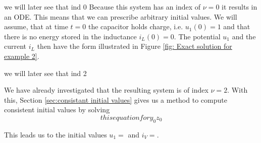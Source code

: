 \begin{example2}
	we will later see that ind 0
	Because this system has an index of $\nu = 0$ it results in an ODE. This means that we can prescribe arbitrary initial values. We will assume, that at time $t=0$ the capacitor holds charge, i.e. $u_1(0) = 1$ and that there is no energy stored in the inductance $i_L(0) = 0$. The potential $u_1$ and the current $i_L$ then have the form illustrated in Figure \ref{fig: Exact solution for example 2}.	
\end{example2}

\begin{example3}
	we will later see that ind 2
	
	We have already investigated that the resulting system is of index $\nu = 2$. With this, Section \ref{sec:consistant initial values} gives us a method to compute consistent initial values by solving
	\begin{displaymath}
		this equation for y_0 z_0
	\end{displaymath}
	
	This leads us to the initial values $u_1 = $ and $i_V = $.
\end{example3}